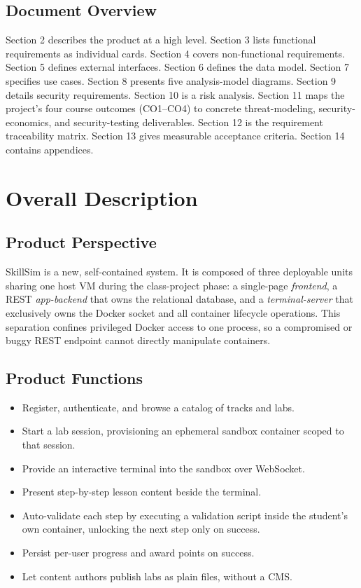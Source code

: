 \documentclass[11pt]{article}
\begin{document}
\subsection{Document Overview}
Section 2 describes the product at a high level. Section 3 lists
functional requirements as individual cards. Section 4 covers
non-functional requirements. Section 5 defines external interfaces.
Section 6 defines the data model. Section 7 specifies use cases.
Section 8 presents five analysis-model diagrams. Section 9 details
security requirements. Section 10 is a risk analysis. Section 11 maps
the project's four course outcomes (CO1--CO4) to concrete
threat-modeling, security-economics, and security-testing
deliverables. Section 12 is the requirement traceability matrix.
Section 13 gives measurable acceptance criteria. Section 14 contains
appendices.

\section{Overall Description}

\subsection{Product Perspective}
SkillSim is a new, self-contained system. It is composed of three
deployable units sharing one host VM during the class-project phase:
a single-page \emph{frontend}, a REST \emph{app-backend} that owns the
relational database, and a \emph{terminal-server} that exclusively
owns the Docker socket and all container lifecycle operations. This
separation confines privileged Docker access to one process, so a
compromised or buggy REST endpoint cannot directly manipulate
containers.

\subsection{Product Functions}
\begin{itemize}
\item Register, authenticate, and browse a catalog of tracks and labs.
\item Start a lab session, provisioning an ephemeral sandbox container
      scoped to that session.
\item Provide an interactive terminal into the sandbox over WebSocket.
\item Present step-by-step lesson content beside the terminal.
\item Auto-validate each step by executing a validation script inside
      the student's own container, unlocking the next step only on
      success.
\item Persist per-user progress and award points on success.
\item Let content authors publish labs as plain files, without a CMS.
\end{itemize}
\end{document}
